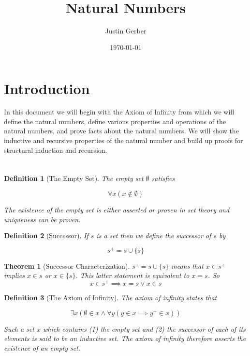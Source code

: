 \documentclass[12pt]{article}
\theoremstyle{break}
\newtheorem{definition}{Definition}[section]
\theoremstyle{break}
\newtheorem{theorem}{Theorem}[section]
\theoremstyle{break}
\theoremstyle{break}
\theoremstyle{break}
\newtheorem{informal definition}[definition]{Informal Definition}
\begin{document}
\title{Natural Numbers}
\author{Justin Gerber}
\date{\today}
\maketitle

\section{Introduction}

In this document we will begin with the Axiom of Infinity from which we will define the natural numbers, define various properties and operations of the natural numbers, and prove facts about the natural numbers. We will show the inductive and recursive properties of the natural number and build up proofs for structural induction and recursion.

\section{}

\begin{definition}[The Empty Set]
The empty set $\emptyset$ satisfies

$$
\forall x (x\not \in \emptyset)
$$

The existence of the empty set is either asserted or proven in set theory and uniqueness can be proven.


\end{definition}

\begin{definition}[Successor]
If $s$ is a set then we define the successor of $s$ by

$$
s^+ = s\cup \{s\}
$$
\end{definition}

\begin{theorem}[Successor Characterization]
\label{thm:succchar}
$s^+ = s \cup \{s\}$  means that $x\in s^+$ implies $x\in s$ or $x \in \{s\}$.
This latter statement is equivalent to $x=s$.
So
$$
x \in s^+ \implies x=s \lor x\in s
$$
\end{theorem}

\begin{definition}[The Axiom of Infinity]
The axiom of infinity states that

$$
\exists x (\emptyset \in x \land \forall y (y\in x \implies y^+ \in x))
$$

Such a set $x$ which contains (1) the empty set and (2) the successor of each of its elements is said to be an inductive set.
The axiom of infinity therefore asserts the existence of an empty set.

\end{definition}
\end{document}
